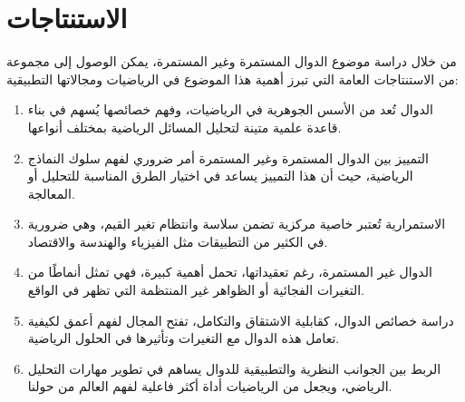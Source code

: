\chapter*{الاستنتاجات}
من خلال دراسة موضوع الدوال المستمرة وغير المستمرة، يمكن الوصول إلى مجموعة من الاستنتاجات العامة التي تبرز أهمية هذا الموضوع في الرياضيات ومجالاتها التطبيقية:

\begin{enumerate}
	\item الدوال تُعد من الأسس الجوهرية في الرياضيات، وفهم خصائصها يُسهم في بناء قاعدة علمية متينة لتحليل المسائل الرياضية بمختلف أنواعها.
	
	\item التمييز بين الدوال المستمرة وغير المستمرة أمر ضروري لفهم سلوك النماذج الرياضية، حيث أن هذا التمييز يساعد في اختيار الطرق المناسبة للتحليل أو المعالجة.
	
	\item الاستمرارية تُعتبر خاصية مركزية تضمن سلاسة وانتظام تغير القيم، وهي ضرورية في الكثير من التطبيقات مثل الفيزياء والهندسة والاقتصاد.
	
	\item الدوال غير المستمرة، رغم تعقيداتها، تحمل أهمية كبيرة، فهي تمثل أنماطًا من التغيرات الفجائية أو الظواهر غير المنتظمة التي تظهر في الواقع.
	
	\item دراسة خصائص الدوال، كقابلية الاشتقاق والتكامل، تفتح المجال لفهم أعمق لكيفية تعامل هذه الدوال مع التغيرات وتأثيرها في الحلول الرياضية.
	
	\item الربط بين الجوانب النظرية والتطبيقية للدوال يساهم في تطوير مهارات التحليل الرياضي، ويجعل من الرياضيات أداة أكثر فاعلية لفهم العالم من حولنا.
\end{enumerate}

